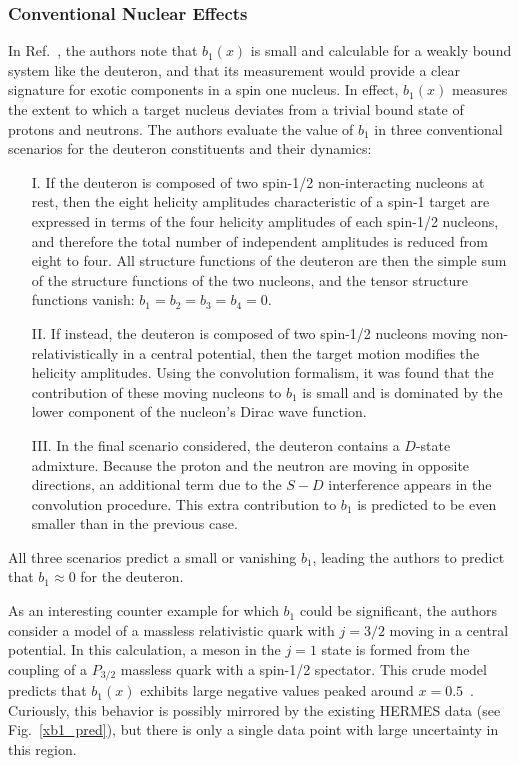 \subsubsection{Conventional Nuclear Effects}
In Ref.~\cite{Hoodbhoy:1988am}, the authors note that $b_1(x)$ is small and calculable for
a weakly bound system like the deuteron, and that its measurement would provide a clear signature 
for exotic components in a spin one nucleus.  In effect, $b_1(x)$ measures the extent to which a target nucleus deviates from a trivial bound state of protons and neutrons.
The authors evaluate the value of $b_1$ in three conventional scenarios for the deuteron
constituents and their dynamics:
\begin{enumerate}
 \item[I.] If the deuteron is composed of two spin-1/2 non-interacting nucleons at rest,
then the eight helicity amplitudes characteristic of a spin-1 target are 
expressed in terms of the four helicity amplitudes of each spin-1/2 nucleons, and 
therefore the total number of independent amplitudes is reduced from eight to four. All structure 
functions of the deuteron are then the simple sum of the structure functions of the two 
nucleons, and the tensor structure functions vanish: $b_1 = b_2 
= b_3 = b_4 = 0$. 
 \item[II.] If instead, the deuteron is composed of two spin-1/2 nucleons moving non-relativistically 
in a central potential, then the target motion modifies the helicity amplitudes. Using
the convolution formalism, it was found that the contribution of these moving nucleons
to $b_1$ is small and is dominated by the lower component of the nucleon's Dirac
wave function.
 \item[III.] In the final scenario considered, the deuteron contains a $D$-state admixture. Because the proton and the neutron
are moving in opposite directions, an additional term due to the $S-D$ interference 
appears in the convolution procedure. This extra contribution to $b_1$ is predicted
to be even smaller than in the previous case.
\end{enumerate}

All three scenarios predict a small or vanishing $b_1$, leading the authors to predict that
$b_1\approx 0$ for the deuteron. 

As an interesting counter example for which 
$b_1$ could be significant, the authors consider a model of a massless relativistic
quark with $j=3/2$ moving in a central potential.  In this calculation, a meson in the $j=1$ state is formed from the coupling of a $P_{3/2}$
massless quark with a spin-1/2 spectator.  This crude model predicts that
$b_1(x)$ exhibits large negative values peaked around $x=0.5$~\cite{Hoodbhoy:1988am}.  
Curiously, this behavior is possibly mirrored by the existing HERMES data (see Fig.~\ref{xb1_pred}), but there is only a single data point with large uncertainty in this region.


